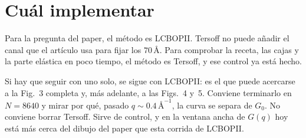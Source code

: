 \documentclass[11pt,a4paper]{article}
\begin{document}
\section{Cuál implementar}

Para la pregunta del paper, el método es LCBOPII.
Tersoff no puede añadir el canal que el artículo usa para fijar los $70\,\text{\AA}$.
Para comprobar la receta, las cajas y la parte elástica en poco tiempo, el método es Tersoff, y ese control ya está hecho.

Si hay que seguir con uno solo, se sigue con LCBOPII: es el que puede acercarse a la Fig.~3 completa y, más adelante, a las Figs.~4 y~5.
Conviene terminarlo en $N=8640$ y mirar por qué, pasado $q\sim 0.4\,\text{\AA}^{-1}$, la curva se separa de $G_0$.
No conviene borrar Tersoff. Sirve de control, y en la ventana ancha de $G(q)$ hoy está más cerca del dibujo del paper que esta corrida de LCBOPII.
\end{document}
